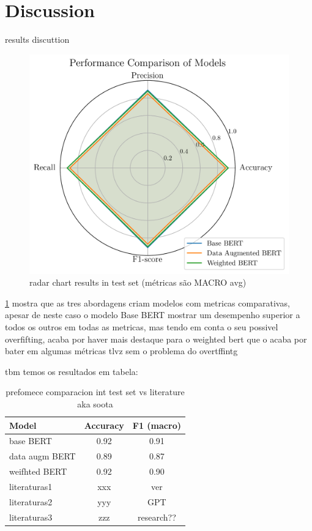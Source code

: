 \documentclass[conference]{IEEEtran}
\begin{document}
\section{Discussion}

results discuttion

\begin{figure}[H]
    \centering
    \includegraphics[width=1\linewidth]{assets/results_radarchart.png}
    \caption{radar chart results in test set (métricas são MACRO avg)}
    \label{fig:results_radarchart}
\end{figure}

\ref{fig:results_radarchart} mostra que as tres abordagens criam modelos com metricas comparativas, apesar de neste caso o modelo Base BERT mostrar um desempenho superior a todos os outros em todas as metricas, mas tendo em conta o seu possivel overfifting, acaba por haver mais destaque para o weighted bert que o acaba por bater em algumas métricas tlvz sem o problema do overtffintg

tbm temos os resultados em tabela:

\begin{table}[H]
\centering
\caption{prefomece comparacion int test set vs literature aka soota}
\label{results_table}
\begin{tabular}{lcc}
\toprule
\textbf{Model} & \textbf{Accuracy} & \textbf{F1 (macro)} \\
\midrule
base BERT & 0.92 & 0.91 \\
data augm BERT & 0.89 & 0.87 \\
weifhted BERT & 0.92 & 0.90 \\
literaturas1 & xxx & ver \\
literaturas2 & yyy & GPT \\
literaturas3 & zzz & research?? \\
\bottomrule
\end{tabular}
\end{table}
\end{document}
